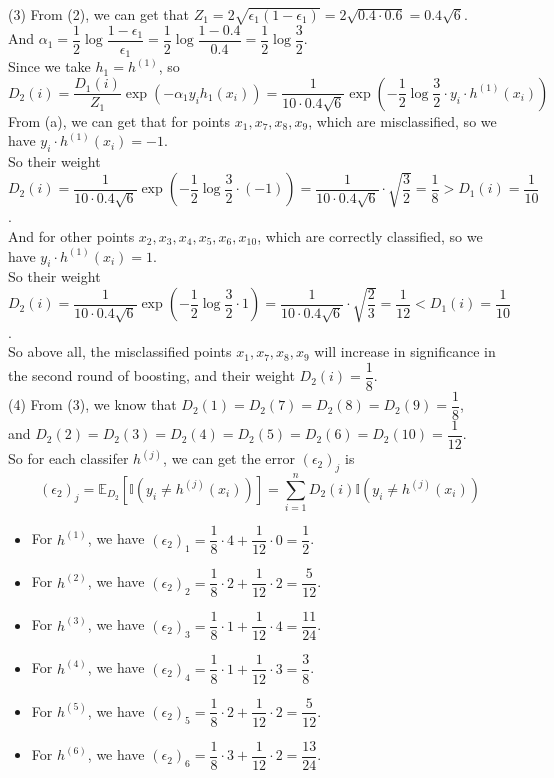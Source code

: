 (3) From (2), we can get that $Z_1=2\sqrt{\epsilon_1(1-\epsilon_1)}=2\sqrt{0.4\cdot 0.6}=0.4\sqrt{6}$. \\
And $\alpha_1=\dfrac{1}{2}\log\dfrac{1-\epsilon_1}{\epsilon_1}=\dfrac{1}{2}\log\dfrac{1-0.4}{0.4}=\dfrac{1}{2}\log\dfrac{3}{2}$. \\
Since we take $h_1=h^{(1)}$, so
$$D_2(i)=\dfrac{D_1(i)}{Z_1}\exp\left(-\alpha_1y_ih_1(x_i)\right)=\dfrac{1}{10\cdot 0.4\sqrt{6}}\exp\left(-\dfrac{1}{2}\log\dfrac{3}{2}\cdot y_i\cdot h^{(1)}(x_i)\right)$$
From (a), we can get that for points $x_1,x_7,x_8,x_9$, which are misclassified, so we have $y_i\cdot h^{(1)}(x_i)=-1$. \\
So their weight $D_2(i)=\dfrac{1}{10\cdot 0.4\sqrt{6}}\exp\left(-\dfrac{1}{2}\log\dfrac{3}{2}\cdot (-1)\right)=\dfrac{1}{10\cdot 0.4\sqrt{6}}\cdot \sqrt{\dfrac{3}{2}}=\dfrac{1}{8}>D_1(i)=\dfrac{1}{10}$. \\
And for other points $x_2,x_3,x_4,x_5,x_6,x_{10}$, which are correctly classified, so we have $y_i\cdot h^{(1)}(x_i)=1$. \\
So their weight $D_2(i)=\dfrac{1}{10\cdot 0.4\sqrt{6}}\exp\left(-\dfrac{1}{2}\log\dfrac{3}{2}\cdot 1\right)=\dfrac{1}{10\cdot 0.4\sqrt{6}}\cdot \sqrt{\dfrac{2}{3}}=\dfrac{1}{12}<D_1(i)=\dfrac{1}{10}$. \\

So above all, the misclassified points $x_1,x_7,x_8,x_9$ will increase in significance in the second round of boosting, and their weight $D_2(i)=\dfrac{1}{8}$. \\

(4) From (3), we know that $D_2(1)=D_2(7)=D_2(8)=D_2(9)=\dfrac{1}{8}$,\\
and $D_2(2)=D_2(3)=D_2(4)=D_2(5)=D_2(6)=D_2(10)=\dfrac{1}{12}$. \\
So for each classifer $h^{(j)}$, we can get the error $(\epsilon_2)_j$ is
$$(\epsilon_2)_j=\mathbb{E}_{D_2}[\mathbb{I}(y_{i} \neq h^{(j)}(x_{i}))]=\sum_{i=1}^{n} D_2(i)\mathbb{I}(y_{i} \neq h^{(j)}(x_{i}))$$

\begin{itemize}
    \item For $h^{(1)}$, we have $(\epsilon_2)_1=\dfrac{1}{8}\cdot 4+\dfrac{1}{12}\cdot 0=\dfrac{1}{2}$.

    \item For $h^{(2)}$, we have $(\epsilon_2)_2=\dfrac{1}{8}\cdot 2+\dfrac{1}{12}\cdot 2=\dfrac{5}{12}$.

    \item For $h^{(3)}$, we have $(\epsilon_2)_3=\dfrac{1}{8}\cdot 1+\dfrac{1}{12}\cdot 4=\dfrac{11}{24}$.

    \item For $h^{(4)}$, we have $(\epsilon_2)_4=\dfrac{1}{8}\cdot 1+\dfrac{1}{12}\cdot 3=\dfrac{3}{8}$.

    \item For $h^{(5)}$, we have $(\epsilon_2)_5=\dfrac{1}{8}\cdot 2+\dfrac{1}{12}\cdot 2=\dfrac{5}{12}$.

    \item For $h^{(6)}$, we have $(\epsilon_2)_6=\dfrac{1}{8}\cdot 3+\dfrac{1}{12}\cdot 2=\dfrac{13}{24}$.
\end{itemize}

